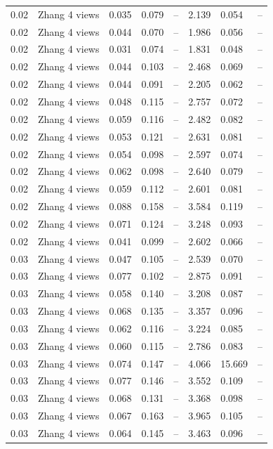 \begin{table}[H]
\begin{tabular}{l c l l l}
0.02 & Zhang 4 views & 0.035 & 0.079 & -- & 2.139 & 0.054 & -- \\
0.02 & Zhang 4 views & 0.044 & 0.070 & -- & 1.986 & 0.056 & -- \\
0.02 & Zhang 4 views & 0.031 & 0.074 & -- & 1.831 & 0.048 & -- \\
0.02 & Zhang 4 views & 0.044 & 0.103 & -- & 2.468 & 0.069 & -- \\
0.02 & Zhang 4 views & 0.044 & 0.091 & -- & 2.205 & 0.062 & -- \\
0.02 & Zhang 4 views & 0.048 & 0.115 & -- & 2.757 & 0.072 & -- \\
0.02 & Zhang 4 views & 0.059 & 0.116 & -- & 2.482 & 0.082 & -- \\
0.02 & Zhang 4 views & 0.053 & 0.121 & -- & 2.631 & 0.081 & -- \\
0.02 & Zhang 4 views & 0.054 & 0.098 & -- & 2.597 & 0.074 & -- \\
0.02 & Zhang 4 views & 0.062 & 0.098 & -- & 2.640 & 0.079 & -- \\
0.02 & Zhang 4 views & 0.059 & 0.112 & -- & 2.601 & 0.081 & -- \\
0.02 & Zhang 4 views & 0.088 & 0.158 & -- & 3.584 & 0.119 & -- \\
0.02 & Zhang 4 views & 0.071 & 0.124 & -- & 3.248 & 0.093 & -- \\
0.02 & Zhang 4 views & 0.041 & 0.099 & -- & 2.602 & 0.066 & -- \\
0.03 & Zhang 4 views & 0.047 & 0.105 & -- & 2.539 & 0.070 & -- \\
0.03 & Zhang 4 views & 0.077 & 0.102 & -- & 2.875 & 0.091 & -- \\
0.03 & Zhang 4 views & 0.058 & 0.140 & -- & 3.208 & 0.087 & -- \\
0.03 & Zhang 4 views & 0.068 & 0.135 & -- & 3.357 & 0.096 & -- \\
0.03 & Zhang 4 views & 0.062 & 0.116 & -- & 3.224 & 0.085 & -- \\
0.03 & Zhang 4 views & 0.060 & 0.115 & -- & 2.786 & 0.083 & -- \\
0.03 & Zhang 4 views & 0.074 & 0.147 & -- & 4.066 & 15.669 & -- \\
0.03 & Zhang 4 views & 0.077 & 0.146 & -- & 3.552 & 0.109 & -- \\
0.03 & Zhang 4 views & 0.068 & 0.131 & -- & 3.368 & 0.098 & -- \\
0.03 & Zhang 4 views & 0.067 & 0.163 & -- & 3.965 & 0.105 & -- \\
0.03 & Zhang 4 views & 0.064 & 0.145 & -- & 3.463 & 0.096 & -- \\

\end{tabular}
\end{table}
